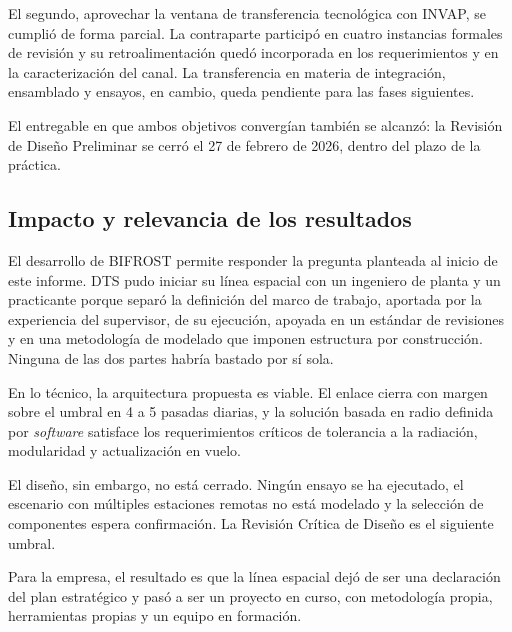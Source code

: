 El segundo, aprovechar la ventana de transferencia tecnológica con INVAP, se cumplió de forma parcial. La contraparte participó en cuatro instancias formales de revisión y su retroalimentación quedó incorporada en los requerimientos y en la caracterización del canal. La transferencia en materia de integración, ensamblado y ensayos, en cambio, queda pendiente para las fases siguientes.

El entregable en que ambos objetivos convergían también se alcanzó: la Revisión de Diseño Preliminar se cerró el 27 de febrero de 2026, dentro del plazo de la práctica.


\subsection{Impacto y relevancia de los resultados}

El desarrollo de BIFROST permite responder la pregunta planteada al inicio de este informe. DTS pudo iniciar su línea espacial con un ingeniero de planta y un practicante porque separó la definición del marco de trabajo, aportada por la experiencia del supervisor, de su ejecución, apoyada en un estándar de revisiones y en una metodología de modelado que imponen estructura por construcción. Ninguna de las dos partes habría bastado por sí sola.

En lo técnico, la arquitectura propuesta es viable. El enlace cierra con margen sobre el umbral en 4 a 5 pasadas diarias, y la solución basada en radio definida por \textit{software} satisface los requerimientos críticos de tolerancia a la radiación, modularidad y actualización en vuelo.

El diseño, sin embargo, no está cerrado. Ningún ensayo se ha ejecutado, el escenario con múltiples estaciones remotas no está modelado y la selección de componentes espera confirmación. La Revisión Crítica de Diseño es el siguiente umbral.

Para la empresa, el resultado es que la línea espacial dejó de ser una declaración del plan estratégico y pasó a ser un proyecto en curso, con metodología propia, herramientas propias y un equipo en formación.
